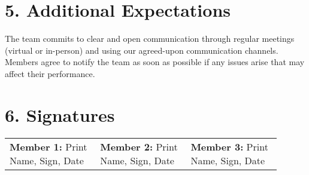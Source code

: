 \documentclass[12pt]{article}
\begin{document}
\section*{5. Additional Expectations}
The team commits to clear and open communication through regular meetings (virtual or in-person) and using our agreed-upon communication channels. Members agree to notify the team as soon as possible if any issues arise that may affect their performance.

\section*{6. Signatures}
\bigskip

\begin{tabular}{p{0.3\linewidth} p{0.3\linewidth} p{0.3\linewidth}}
\textbf{Member 1:} \newline Print Name, Sign, Date & \textbf{Member 2:} \newline Print Name, Sign, Date & \textbf{Member 3:} \newline Print Name, Sign, Date \\
\end{tabular}
\end{document}
